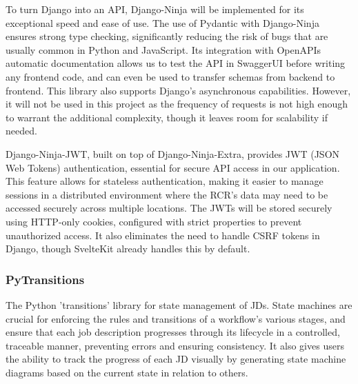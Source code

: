 To turn Django into an API, Django-Ninja will be implemented for its exceptional speed and ease of use. The use of Pydantic with Django-Ninja ensures strong type checking, significantly reducing the risk of bugs that are usually common in Python and JavaScript. Its integration with OpenAPIs automatic documentation allows us to test the API in SwaggerUI before writing any frontend code, and can even be used to transfer schemas from backend to frontend. This library also supports Django's asynchronous capabilities. However, it will not be used in this project as the frequency of requests is not high enough to warrant the additional complexity, though it leaves room for scalability if needed.

Django-Ninja-JWT, built on top of Django-Ninja-Extra, provides JWT (JSON Web Tokens) authentication, essential for secure API access in our application. This feature allows for stateless authentication, making it easier to manage sessions in a distributed environment where the RCR's data may need to be accessed securely across multiple locations. The JWTs will be stored securely using HTTP-only cookies, configured with strict properties to prevent unauthorized access. It also eliminates the need to handle CSRF tokens in Django, though SvelteKit already handles this by default.

\subsubsection{PyTransitions}
The Python 'transitions' library for state management of JDs. State machines are crucial for enforcing the rules and transitions of a workflow's various stages, and ensure that each job description progresses through its lifecycle in a controlled, traceable manner, preventing errors and ensuring consistency. It also gives users the ability to track the progress of each JD visually by generating state machine diagrams based on the current state in relation to others.

